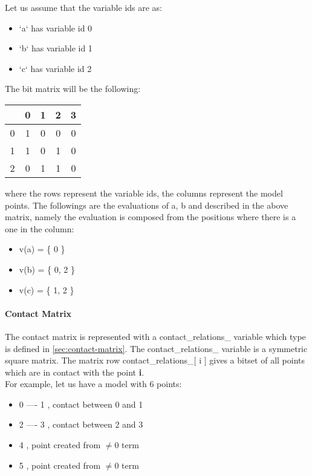 \documentclass{article}
\begin{document}
			\newline
			Let us assume that the variable ids are as:
			\begin{itemize} 
				\item `a` has variable id 0
				\item `b` has variable id 1
				\item `c` has variable id 2
			\end{itemize}
			The bit matrix will be the following:
			\begin{center}
			\begin{tabular}{ |c||c|c|c|c|}
				\hline
				\ & 0 & 1 & 2 & 3 \\
				\hline
				\hline
				0 & 1 & 0 & 0 & 0 \\
				\hline
				1 & 1 & 0 & 1 & 0 \\
				\hline
				2 & 0 & 1 & 1 & 0 \\
				\hline
			\end{tabular}
			\end{center}
			where the rows represent the variable ids, the columns represent the model points.
			The followings are the evaluations of a, b and described in the above matrix,
				namely the evaluation is composed from the positions where there is a one in the column:
			\begin{itemize}
				\item v(a) = \{ 0 \}
				\item v(b) = \{ 0, 2 \}
				\item v(c) = \{ 1, 2 \}
			\end{itemize}

		\paragraph{Contact Matrix} The contact matrix is represented with a contact\_relations\_ variable which type is defined in \ref{sec:contact-matrix}.
			The contact\_relations\_ variable is a symmetric square matrix. The matrix row contact\_relations\_[ i ] gives a bitset of all points which are in contact with the point \textbf{i}. \\
			For example, let us have a model with 6 points:
			\begin{itemize}
				\item[] 0 ---- 1 	\:\:\:\:\:\:, contact between 0 and 1
				\item[] 2 ---- 3 	\:\:\:\:\:\:, contact between 2 and 3
				\item[] 4 		\:\:\:\:\:\:\:\:\:\:\:\:\:\:\:\:\:, point created from $\neq 0$ term
				\item[] 5 		\:\:\:\:\:\:\:\:\:\:\:\:\:\:\:\:\:, point created from $\neq 0$ term
			\end{itemize}
\end{document}

